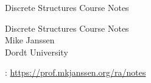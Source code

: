 \documentclass[oneside,10pt,]{book}
\newcommand{\titlepagefont}{\relax}
\begin{document}
\raggedbottom
\frontmatter
\thispagestyle{empty}
{\titlepagefont\centering
\vspace*{0.28\textheight}
{\Huge Discrete Structures Course Notes}\\}
\clearpage
\thispagestyle{empty}
{\titlepagefont\centering
\vspace*{0.14\textheight}
{\Huge Discrete Structures Course Notes}\\[3\baselineskip]
{\Large Mike Janssen}\\[0.5\baselineskip]
{\Large Dordt University}\\}
\clearpage
\thispagestyle{empty}
\hypertarget{g:colophon:idp105545050341008}{}
: \href{https:\slash{}\slash{}prof.mkjanssen.org\slash{}ra\slash{}notes}{https:\slash{}\slash{}prof.mkjanssen.org\slash{}ra\slash{}notes}\par\medskip
{}
\null\clearpage
\setcounter{tocdepth}{1}
\renewcommand*\contentsname{Contents}
\tableofcontents
\mainmatter
%
%
\typeout{************************************************}
\typeout{************************************************}
%
\end{document}
